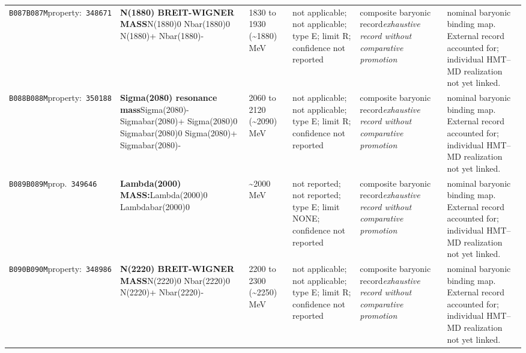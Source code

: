\begin{landscape}
\begin{longtable}{L{1.85cm}L{4.45cm}L{2.35cm}L{4.05cm}L{3.35cm}L{7.15cm}}
\texttt{B087}\newline \texttt{B087M}\newline property:\ \texttt{348671} & \textbf{N(1880) BREIT-WIGNER MASS}\newline N(1880)0 \textbar{}\allowbreak{} Nbar(1880)0 \textbar{}\allowbreak{} N(1880)+ \textbar{}\allowbreak{} Nbar(1880)- & 1830 to 1930 (\textasciitilde{}1880)\,MeV & not applicable; not applicable; type E; limit R; confidence not reported & composite baryonic record\newline \emph{exhaustive record without comparative promotion} & nominal baryonic binding map. External record accounted for; individual HMT--MD realization not yet linked. \\
\texttt{B088}\newline \texttt{B088M}\newline property:\ \texttt{350188} & \textbf{Sigma(2080) resonance mass}\newline Sigma(2080)- \textbar{}\allowbreak{} Sigmabar(2080)+ \textbar{}\allowbreak{} Sigma(2080)0 \textbar{}\allowbreak{} Sigmabar(2080)0 \textbar{}\allowbreak{} Sigma(2080)+ \textbar{}\allowbreak{} Sigmabar(2080)- & 2060 to 2120 (\textasciitilde{}2090)\,MeV & not applicable; not applicable; type E; limit R; confidence not reported & composite baryonic record\newline \emph{exhaustive record without comparative promotion} & nominal baryonic binding map. External record accounted for; individual HMT--MD realization not yet linked. \\
\texttt{B089}\newline \texttt{B089M}\newline prop.\ \texttt{349646} & \textbf{Lambda(2000) MASS:}\newline Lambda(2000)0 \textbar{}\allowbreak{} Lambdabar(2000)0 & \textasciitilde{}2000\,MeV & not reported; not reported; type E; limit NONE; confidence not reported & composite baryonic record\newline \emph{exhaustive record without comparative promotion} & nominal baryonic binding map. External record accounted for; individual HMT--MD realization not yet linked. \\
\texttt{B090}\newline \texttt{B090M}\newline property:\ \texttt{348986} & \textbf{N(2220) BREIT-WIGNER MASS}\newline N(2220)0 \textbar{}\allowbreak{} Nbar(2220)0 \textbar{}\allowbreak{} N(2220)+ \textbar{}\allowbreak{} Nbar(2220)- & 2200 to 2300 (\textasciitilde{}2250)\,MeV & not applicable; not applicable; type E; limit R; confidence not reported & composite baryonic record\newline \emph{exhaustive record without comparative promotion} & nominal baryonic binding map. External record accounted for; individual HMT--MD realization not yet linked. \\

\end{longtable}
\end{landscape}
